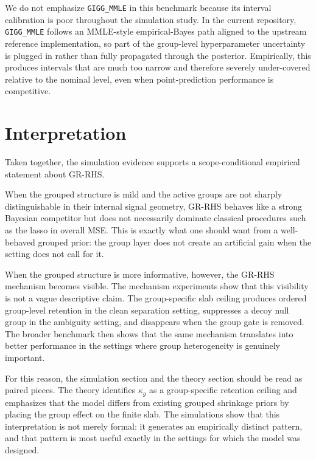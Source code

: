 \documentclass[11pt]{article}
\begin{document}
We do not emphasize \texttt{GIGG\_MMLE} in this benchmark because its interval
calibration is poor throughout the simulation study. In the current repository,
\texttt{GIGG\_MMLE} follows an MMLE-style empirical-Bayes path aligned to the
upstream reference implementation, so part of the group-level hyperparameter
uncertainty is plugged in rather than fully propagated through the posterior.
Empirically, this produces intervals that are much too narrow and therefore
severely under-covered relative to the nominal level, even when point-prediction
performance is competitive.

\section{Interpretation}

Taken together, the simulation evidence supports a scope-conditional empirical
statement about GR-RHS.

When the grouped structure is mild and the active groups are not sharply
distinguishable in their internal signal geometry, GR-RHS behaves like a strong
Bayesian competitor but does not necessarily dominate classical procedures such
as the lasso in overall MSE. This is exactly what one should want from a
well-behaved grouped prior: the group layer does not create an artificial gain
when the setting does not call for it.

When the grouped structure is more informative, however, the GR-RHS mechanism
becomes visible. The mechanism experiments show that this visibility is not a
vague descriptive claim. The group-specific slab ceiling produces ordered
group-level retention in the clean separation setting, suppresses a decoy null
group in the ambiguity setting, and disappears when the group gate is removed.
The broader benchmark then shows that the same mechanism translates into better
performance in the settings where group heterogeneity is genuinely important.

For this reason, the simulation section and the theory section should be read as
paired pieces. The theory identifies \(\kappa_g\) as a group-specific retention
ceiling and emphasizes that the model differs from existing grouped shrinkage
priors by placing the group effect on the finite slab. The simulations show that
this interpretation is not merely formal: it generates an empirically distinct
pattern, and that pattern is most useful exactly in the settings for which the
model was designed.
\end{document}
